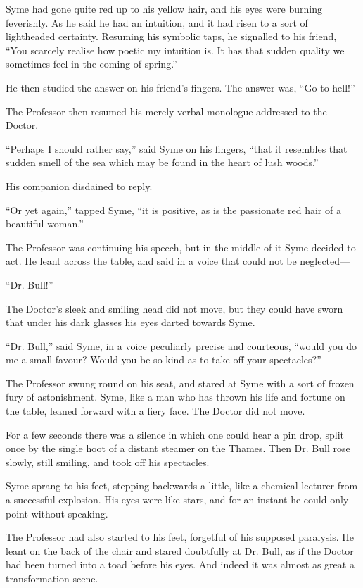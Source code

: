 Syme had gone quite red up to his yellow hair, and his eyes were burning feverishly. As he said he had an intuition, and it had risen to a sort of lightheaded certainty. Resuming his symbolic taps, he signalled to his friend, “You scarcely realise how poetic my intuition is. It has that sudden quality we sometimes feel in the coming of spring.”

He then studied the answer on his friend’s fingers. The answer was, “Go to hell!”

The Professor then resumed his merely verbal monologue addressed to the Doctor.

“Perhaps I should rather say,” said Syme on his fingers, “that it resembles that sudden smell of the sea which may be found in the heart of lush woods.”

His companion disdained to reply.

“Or yet again,” tapped Syme, “it is positive, as is the passionate red hair of a beautiful woman.”

The Professor was continuing his speech, but in the middle of it Syme decided to act. He leant across the table, and said in a voice that could not be neglected⁠—

“Dr. Bull!”

The Doctor’s sleek and smiling head did not move, but they could have sworn that under his dark glasses his eyes darted towards Syme.

“Dr. Bull,” said Syme, in a voice peculiarly precise and courteous, “would you do me a small favour? Would you be so kind as to take off your spectacles?”

The Professor swung round on his seat, and stared at Syme with a sort of frozen fury of astonishment. Syme, like a man who has thrown his life and fortune on the table, leaned forward with a fiery face. The Doctor did not move.

For a few seconds there was a silence in which one could hear a pin drop, split once by the single hoot of a distant steamer on the Thames. Then Dr. Bull rose slowly, still smiling, and took off his spectacles.

Syme sprang to his feet, stepping backwards a little, like a chemical lecturer from a successful explosion. His eyes were like stars, and for an instant he could only point without speaking.

The Professor had also started to his feet, forgetful of his supposed paralysis. He leant on the back of the chair and stared doubtfully at Dr. Bull, as if the Doctor had been turned into a toad before his eyes. And indeed it was almost as great a transformation scene.

